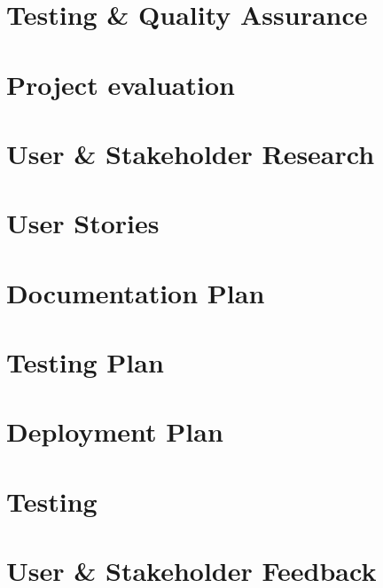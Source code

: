 \documentclass[12pt]{report}
\newcommand\blankpage{%
    \null
    \thispagestyle{empty}%
    \addtocounter{page}{-1}%
    \newpage}
\begin{document}
\chapter{Testing \& Quality Assurance}


\chapter{Project evaluation}


\afterpage{\blankpage}

\begin{appendices}

\chapter{User \& Stakeholder Research}


\chapter{User Stories}


\chapter{Documentation Plan}


\chapter{Testing Plan}


\chapter{Deployment Plan}


\chapter{Testing}


\chapter{User \& Stakeholder Feedback}



\end{appendices}

\printbibliography

\afterpage{\blankpage}
\end{document}
